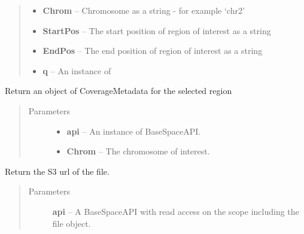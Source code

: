\documentclass[letterpaper,10pt,english]{sphinxmanual}
\begin{document}
\begin{fulllineitems}
\begin{fulllineitems}
\begin{quote}
\begin{description}
\begin{itemize}
\item {} 
\textbf{Chrom} -- Chromosome as a string - for example `chr2'

\item {} 
\textbf{StartPos} -- The start position of region of interest as a string

\item {} 
\textbf{EndPos} -- The end position of region of interest as a string

\item {} 
\textbf{q} -- An instance of

\end{itemize}

\end{description}\end{quote}

\end{fulllineitems}


\begin{fulllineitems}
\label{Available modules:BaseSpacePy.model.File.File.getCoverageMeta}
Return an object of CoverageMetadata for the selected region
\begin{quote}\begin{description}
\item[{Parameters}] \leavevmode\begin{itemize}
\item {} 
\textbf{api} -- An instance of BaseSpaceAPI.

\item {} 
\textbf{Chrom} -- The chromosome of interest.

\end{itemize}

\end{description}\end{quote}

\end{fulllineitems}


\begin{fulllineitems}
\label{Available modules:BaseSpacePy.model.File.File.getFileUrl}
Return the S3 url of the file.
\begin{quote}\begin{description}
\item[{Parameters}] \leavevmode
\textbf{api} -- A BaseSpaceAPI with read access on the scope including the file object.


\end{description}
\end{quote}
\end{fulllineitems}
\end{fulllineitems}
\end{document}
